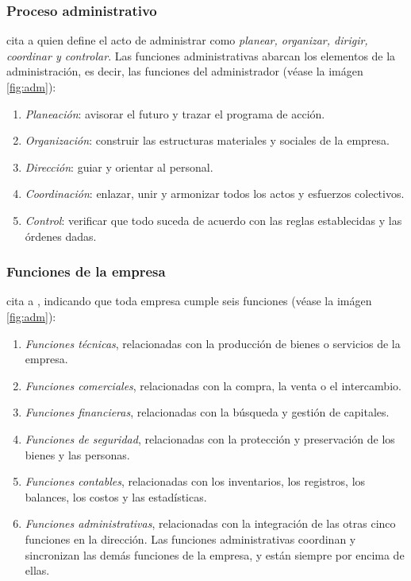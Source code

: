\subsubsection{Proceso administrativo}
\cite{chiavenato} cita a \citep{fayol} quien define el acto de administrar como
\emph{planear, organizar, dirigir, coordinar y controlar}. Las funciones administrativas
abarcan los elementos de la administración, es decir, las funciones del administrador
(véase la imágen \ref{fig:adm}):
\begin{enumerate}
    \item \emph{Planeación}: avisorar el futuro y trazar el programa de acción.
    \item \emph{Organización}: construir las estructuras materiales y sociales de
          la empresa.
    \item \emph{Dirección}: guiar y orientar al personal.
    \item \emph{Coordinación}: enlazar, unir y armonizar todos los actos y esfuerzos
          colectivos.
    \item \emph{Control}: verificar que todo suceda de acuerdo con las reglas establecidas
          y las órdenes dadas.
\end{enumerate}

\subsubsection{Funciones de la empresa}
\cite{chiavenato} cita a \cite{fayol}, indicando que toda empresa cumple seis funciones
(véase la imágen \ref{fig:adm}):
\begin{enumerate}
    \item \emph{Funciones técnicas}, relacionadas con la producción de bienes o
          servicios de la empresa.
    \item \emph{Funciones comerciales}, relacionadas con la compra, la venta o el
          intercambio.
    \item \emph{Funciones financieras}, relacionadas con la búsqueda y gestión
          de capitales.
    \item \emph{Funciones de seguridad}, relacionadas con la protección y preservación
          de los bienes y las personas.
    \item \emph{Funciones contables}, relacionadas con los inventarios, los registros,
          los balances, los costos y las estadísticas.
    \item \emph{Funciones administrativas}, relacionadas con la integración de las
          otras cinco funciones en la dirección. Las funciones administrativas
          coordinan y sincronizan las demás funciones de la empresa, y están siempre
          por encima de ellas.
\end{enumerate}

